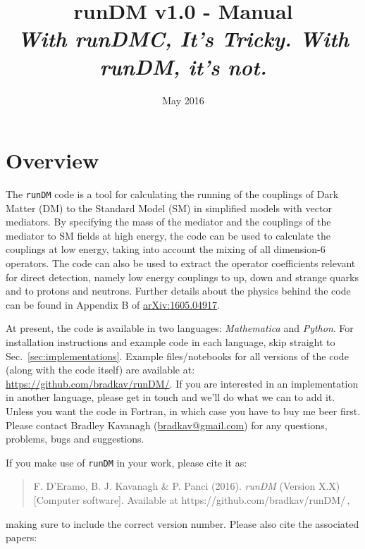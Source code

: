\documentclass[notitlepage,12pt]{article}
\newcommand{\runDM}{\texttt{runDM}\xspace}
\newcommand{\ourpaper}{\href{http://arxiv.org/abs/1605.04917}{arXiv:1605.04917}\xspace}
\begin{document}
\title{runDM v1.0 - Manual \\ \vspace{0.5cm}\normalsize \textit{With runDMC, It's Tricky. With runDM, it's not.}}

\date{\vspace{-1cm} May 2016}

\maketitle

\tableofcontents

\section{Overview}

The \runDM code is a tool for calculating the running of the couplings of Dark Matter (DM) to the Standard Model (SM) in simplified models with vector mediators. By specifying the mass of the mediator and the couplings of the mediator to SM fields at high energy, the code can be used to calculate the couplings at low energy, taking into account the mixing of all dimension-6 operators. The code can also be used to extract the operator coefficients relevant for direct detection, namely low energy couplings to up, down and strange quarks and to protons and neutrons. Further details about the physics behind the code can be found in Appendix B of \ourpaper.

At present, the code is available in two languages: \textit{Mathematica} and \textit{Python}. For installation instructions and example code in each language, skip straight to Sec.~\ref{sec:implementations}. Example files/notebooks for all versions of the code (along with the code itself) are available at: \href{https://github.com/bradkav/runDM/}{https://github.com/bradkav/runDM/}. If you are interested in an implementation in another language, please get in touch and we'll do what we can to add it. Unless you want the code in Fortran, in which case you have to buy me beer first. Please contact Bradley Kavanagh (\href{mailto:bradkav@gmail.com?subject=runDM v.10}{bradkav@gmail.com}) for any questions, problems, bugs and suggestions.

If you make use of \runDM in your work, please cite it as:

\begin{quote}
F. D'Eramo, B. J. Kavanagh \& P. Panci (2016). \textit{runDM} (Version X.X) [Computer software]. Available at https://github.com/bradkav/runDM/\,,
\end{quote}
making sure to include the correct version number. Please also cite the associated papers:
\end{document}
